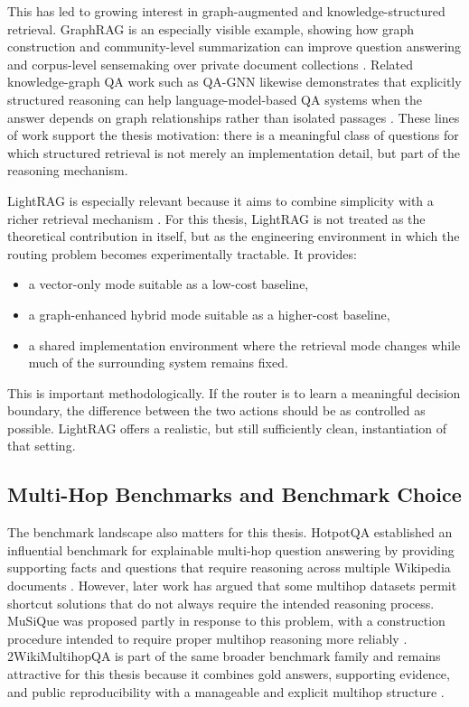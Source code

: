 \documentclass[11pt, a4paper]{article}
\begin{document}
This has led to growing interest in graph-augmented and knowledge-structured retrieval. GraphRAG is an especially visible example, showing how graph construction and community-level summarization can improve question answering and corpus-level sensemaking over private document collections \cite{edge2024graphrag}. Related knowledge-graph QA work such as QA-GNN likewise demonstrates that explicitly structured reasoning can help language-model-based QA systems when the answer depends on graph relationships rather than isolated passages \cite{yasunaga2021qagnn}. These lines of work support the thesis motivation: there is a meaningful class of questions for which structured retrieval is not merely an implementation detail, but part of the reasoning mechanism.

LightRAG is especially relevant because it aims to combine simplicity with a richer retrieval mechanism \cite{lightrag2024}. For this thesis, LightRAG is not treated as the theoretical contribution in itself, but as the engineering environment in which the routing problem becomes experimentally tractable. It provides:
\begin{itemize}[label=--]
    \item a vector-only mode suitable as a low-cost baseline,
    \item a graph-enhanced hybrid mode suitable as a higher-cost baseline,
    \item a shared implementation environment where the retrieval mode changes while much of the surrounding system remains fixed.
\end{itemize}

This is important methodologically. If the router is to learn a meaningful decision boundary, the difference between the two actions should be as controlled as possible. LightRAG offers a realistic, but still sufficiently clean, instantiation of that setting.

\subsection{Multi-Hop Benchmarks and Benchmark Choice}

The benchmark landscape also matters for this thesis. HotpotQA established an influential benchmark for explainable multi-hop question answering by providing supporting facts and questions that require reasoning across multiple Wikipedia documents \cite{yang2018hotpotqa}. However, later work has argued that some multihop datasets permit shortcut solutions that do not always require the intended reasoning process. MuSiQue was proposed partly in response to this problem, with a construction procedure intended to require proper multihop reasoning more reliably \cite{trivedi2022musique}. 2WikiMultihopQA is part of the same broader benchmark family and remains attractive for this thesis because it combines gold answers, supporting evidence, and public reproducibility with a manageable and explicit multihop structure \cite{ho2020twowiki}.
\end{document}
